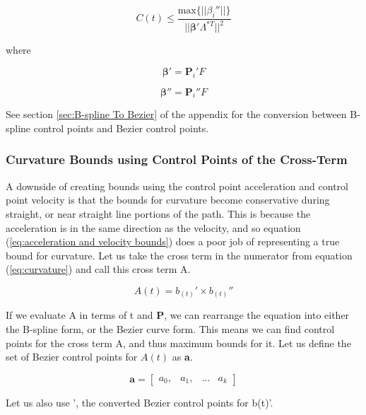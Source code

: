 \documentclass{article}
\begin{document}
\begin{equation}
    C(t) \leq \frac{\text{max}\{||\beta_i''||\}}{||\boldsymbol{\beta}' \Lambda^{*T}||^2}
\end{equation}

where

\begin{equation}
    \boldsymbol{\beta}' = \boldsymbol{P}_i' F
\end{equation}

\begin{equation}
    \boldsymbol{\beta}'' = \boldsymbol{P}_i'' F
\end{equation}

See section \ref{sec:B-spline To Bezier} of the appendix for the conversion between B-spline control points and Bezier control points.

\subsubsection{Curvature Bounds using Control Points of the Cross-Term}

A downside of creating bounds using the control point acceleration and control point velocity is that the bounds for curvature become conservative during straight, or near straight line portions of the path. This is because the acceleration is in the same direction as the velocity, and so equation (\ref{eq:acceleration and velocity bounds}) does a poor job of representing a true bound for curvature. 
Let us take the cross term in the numerator from equation (\ref{eq:curvature}) and call this cross term A. 

\begin{equation}
    A(t)  = b_{(t)}' \times b_{(t)}''
\end{equation}

If we evaluate A in terms of t and \textbf{P}, we can rearrange the equation into either the B-spline form, or the Bezier curve form. This means we can find control points for the cross term A, and thus maximum bounds for it. Let us define the set of Bezier control points for \(A(t)\) as \textbf{a}.

\begin{equation}
    \textbf{a} = \begin{bmatrix}a_0, & a_1, & ... & a_{k}    \end{bmatrix}
\end{equation}

Let us also use \boldsymbol{\beta}', the converted Bezier control points for b(t)'.
\end{document}
